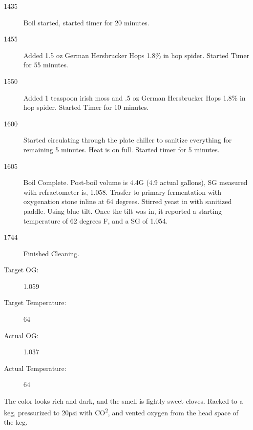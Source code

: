\begin{description}
    \item[1435] Boil started, started timer for 20 minutes.
    \item[1455] Added 1.5 oz German Hersbrucker Hops 1.8\% in hop spider.  Started Timer for 55 minutes.
    \item[1550] Added 1 teaspoon irish moss and .5 oz  German Hersbrucker Hops 1.8\% in hop spider. Started Timer for 10 minutes.
    \item[1600] Started circulating through the plate chiller to sanitize everything for remaining 5 minutes.  Heat is on full. Started timer for 5 minutes.
    \item[1605] Boil Complete.  Post-boil volume is 4.4G (4.9 actual gallons), SG measured with refractometer is, 1.058. Trasfer to primary fermentation with oxygenation stone inline at 64 degrees.  Stirred yeast in with sanitized paddle. Using blue tilt. Once the tilt was in, it reported a starting temperature of 62 degrees F, and a SG of 1.054.
    \item[1744] Finished Cleaning.

    \item[Target OG:] 1.059
    \item[Target Temperature:] 64
    \item[Actual OG:] 1.037
    \item[Actual Temperature:] 64
\end{description}

\def\todaysdate{20201206}
\newday{\todaysdate}\label{\todaysdate}

The color looks rich and dark, and the smell is lightly sweet cloves.  Racked to a keg, pressurized to 20psi with CO\textsuperscript{2}, and vented oxygen from the head space of the keg.
